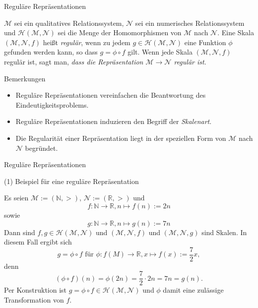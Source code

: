 \documentclass[
  8pt,
  ignorenonframetext,
]{beamer}
\providecommand{\tightlist}{%
  \setlength{\itemsep}{0pt}\setlength{\parskip}{0pt}}
\begin{document}
\begin{frame}{Reguläre Repräsentationen}
\protect\hypertarget{reguluxe4re-repruxe4sentationen-2}{}
\small
\begin{definition}
\justifying
$\mathcal{M}$ sei ein qualitatives Relationssystem, $\mathcal{N}$ sei ein numerisches
Relationssystem und $\mathcal{H}(\mathcal{M},\mathcal{N})$ sei die Menge der Homomorphismen
von $\mathcal{M}$ nach $\mathcal{N}$. Eine Skala $(\mathcal{M},\mathcal{N},f)$ heißt
\textit{regulär}, wenn zu jedem $g \in \mathcal{H}(\mathcal{M},\mathcal{N})$ eine
Funktion $\phi$ gefunden werden kann, so dass $g = \phi \circ f$ gilt. Wenn jede
Skala $(\mathcal{M},\mathcal{N}, f)$ regulär ist, sagt man, \textit{dass die Repräsentation 
$\mathcal{M}\to \mathcal{N}$ regulär ist}.
\end{definition}

\footnotesize

Bemerkungen

\begin{itemize}
\tightlist
\item
  Reguläre Repräsentationen vereinfachen die Beantwortung des
  Eindeutigkeitsproblems.
\item
  Reguläre Repräsentationen induzieren den Begriff der \emph{Skalenart}.
\item
  Die Regularität einer Repräsentation liegt in der speziellen Form von
  \(\mathcal{M}\) nach \(\mathcal{N}\) begründet.
\end{itemize}
\end{frame}

\begin{frame}{Reguläre Repräsentationen}
\protect\hypertarget{reguluxe4re-repruxe4sentationen-3}{}
\small

\noindent (1) Beispiel für eine reguläre Repräsentation \footnotesize

\footnotesize

Es seien \(\mathcal{M} := (\mathbb{N},>)\),
\(\mathcal{N} := (\mathbb{R},>)\) und \begin{equation}
f : \mathbb{N} \to \mathbb{R}, n \mapsto f(n) := 2n
\end{equation} sowie \begin{equation}
g : \mathbb{N} \to \mathbb{R}, n \mapsto g(n) := 7n
\end{equation} Dann sind
\(f,g\in \mathcal{H}(\mathcal{M}, \mathcal{N})\) und
\((\mathcal{M},\mathcal{N},f)\) und \((\mathcal{M},\mathcal{N},g)\) sind
Skalen. In diesem Fall ergibt sich \begin{equation}
g = \phi \circ f \mbox{ für }\phi : f(M) \to \mathbb{R}, x \mapsto f(x) := \frac{7}{2}x,
\end{equation} denn \begin{equation}
(\phi \circ f)(n) = \phi(2n) = \frac{7}{2}\cdot 2n = 7n = g(n).
\end{equation} Per Konstruktion ist
\(g = \phi\circ f\in \mathcal{H}(\mathcal{M}, \mathcal{N})\) und
\(\phi\) damit eine zulässige Transformation von \(f\).
\end{frame}
\end{document}
